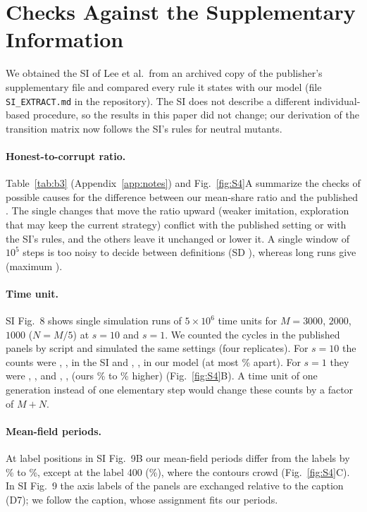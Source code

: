 \documentclass[journal]{IEEEtran}
\begin{document}
\section{Checks Against the Supplementary Information}\label{app:si}

We obtained the SI of Lee et al.\ from an archived copy of the publisher's supplementary file and
compared every rule it states with our model (file \texttt{SI\_EXTRACT.md} in the repository).
The SI does not describe a different individual-based procedure, so the results in this paper
did not change; our derivation of the transition matrix now follows the SI's rules for
neutral mutants.

\paragraph{Honest-to-corrupt ratio.} Table~\ref{tab:b3} (Appendix~\ref{app:notes}) and
Fig.~\ref{fig:S4}A summarize the checks of possible causes for the difference between our
mean-share ratio and the published \PaperRatio{}. The single changes that move the ratio upward
(weaker imitation, exploration that may keep the current strategy) conflict with the published
setting or with the SI's rules, and the others leave it unchanged or lower it. A single window of
$10^5$ steps is too noisy to decide between definitions (SD \ShortRunSD), whereas
\LongRunN{} long runs give \LongRunMean{} (maximum \LongRunMax).

\paragraph{Time unit.} SI Fig.~8 shows single simulation runs of $5\times10^6$ time units for
$M=3000$, $2000$, $1000$ ($N=M/5$) at $s=10$ and $s=1$. We counted the cycles in the published
panels by script and simulated the same settings (four replicates). For $s=10$ the counts were
\SIEightA, \SIEightD, \SIEightG{} in the SI and \OurEightA, \OurEightD, \OurEightG{} in our model
(at most \EightMaxDevStrong\% apart). For $s=1$ they were \SIEightB, \SIEightE, \SIEightH{} and
\OurEightB, \OurEightE, \OurEightH{} (ours \EightMinDevWeak\% to \EightMaxDevWeak\% higher)
(Fig.~\ref{fig:S4}B). A time unit of one generation instead of one elementary step would change
these counts by a factor of $M+N$.

\paragraph{Mean-field periods.} At \NineNpoints{} label positions in SI Fig.~9B our mean-field
periods differ from the labels by \NineMinDev\% to \NineMaxDev\%, except at the label 400
(\NineDevFourHundred\%), where the contours crowd (Fig.~\ref{fig:S4}C). In SI Fig.~9 the axis
labels of the panels are exchanged relative to the caption (D7); we follow the caption, whose
assignment fits our periods.
\end{document}
